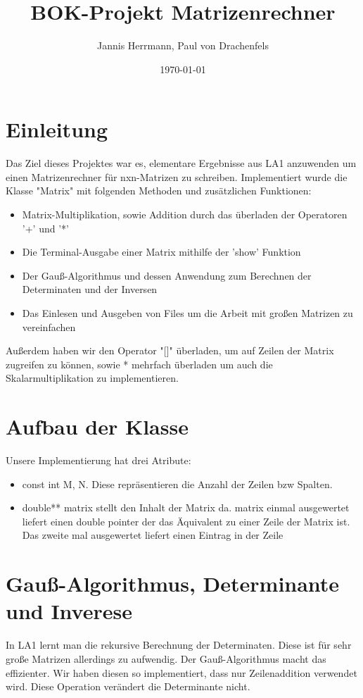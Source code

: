 \documentclass[a4paper]{article}
\title{BOK-Projekt Matrizenrechner}
\author{Jannis Herrmann, Paul von Drachenfels}
\date{\today}
\begin{document}
\maketitle


\section*{Einleitung}

Das Ziel dieses Projektes war es, elementare Ergebnisse aus LA1 anzuwenden um einen Matrizenrechner für nxn-Matrizen zu schreiben. Implementiert wurde die Klasse "Matrix" mit folgenden Methoden und zusätzlichen  Funktionen:
\begin{itemize}
	\item Matrix-Multiplikation, sowie Addition durch das überladen der Operatoren '+' und '*'
	\item Die Terminal-Ausgabe einer Matrix mithilfe der 'show' Funktion
	\item Der Gauß-Algorithmus und dessen Anwendung zum Berechnen der Determinaten und der Inversen
	\item Das Einlesen und Ausgeben von Files um die Arbeit mit großen Matrizen zu vereinfachen
\end{itemize}

Außerdem haben wir den Operator "[]" überladen, um auf Zeilen der Matrix zugreifen zu können, sowie * mehrfach überladen um auch die Skalarmultiplikation zu implementieren.

\section*{Aufbau der Klasse}

Unsere Implementierung hat drei Atribute:
\begin{itemize}
	\item const int M, N. Diese repräsentieren die Anzahl der Zeilen bzw Spalten. 
	\item double** matrix stellt den Inhalt der Matrix da. matrix einmal ausgewertet liefert einen double pointer der das Äquivalent zu einer Zeile der Matrix ist. Das zweite mal ausgewertet liefert einen Eintrag in der Zeile
\end{itemize}

\section*{Gauß-Algorithmus, Determinante und Inverese}

In LA1 lernt man die rekursive Berechnung der Determinaten. Diese ist für sehr große Matrizen  allerdings zu aufwendig. Der Gauß-Algorithmus macht das effizienter. Wir haben diesen so implementiert, dass nur Zeilenaddition verwendet wird. Diese Operation verändert die Determinante nicht.
\end{document}
